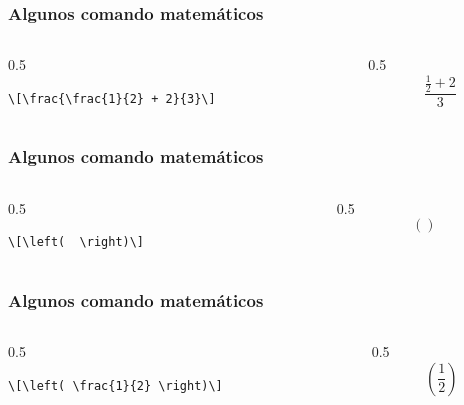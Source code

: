 \documentclass[12pt,aspectratio=169,ignorenonframetext]{ltxbeamer}
\begin{document}
\begin{frame}[fragile]
\frametitle{Algunos comando matemáticos}

\begin{columns}
    \begin{column}{0.5\textwidth}
        \begin{verbatim}
\[\frac{\frac{1}{2} + 2}{3}\]
        \end{verbatim}
    \end{column}
    {\color{gray} \vline}
    \begin{column}{0.5\textwidth}
        \[\frac{\frac{1}{2} + 2}{3}\]
    \end{column}
\end{columns}
\end{frame}





\begin{frame}[fragile]
\frametitle{Algunos comando matemáticos}

\begin{columns}
    \begin{column}{0.5\textwidth}
        \begin{verbatim}
\[\left(  \right)\]
        \end{verbatim}
    \end{column}
    {\color{gray} \vline}
    \begin{column}{0.5\textwidth}
        \[\left(  \right)\]
    \end{column}
\end{columns}
\end{frame}





\begin{frame}[fragile]
\frametitle{Algunos comando matemáticos}

\begin{columns}
    \begin{column}{0.5\textwidth}
        \begin{verbatim}
\[\left( \frac{1}{2} \right)\]
        \end{verbatim}
    \end{column}
    {\color{gray} \vline}
    \begin{column}{0.5\textwidth}
        \[\left( \frac{1}{2} \right)\]
    \end{column}
\end{columns}
\end{frame}
\end{document}
